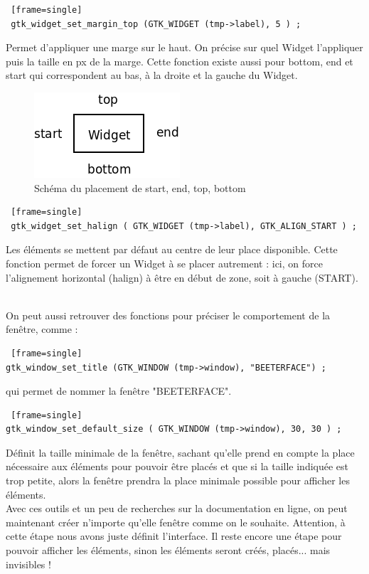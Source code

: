 \documentclass[11pt,french,a4paper]{report}
\begin{document}
\begin{lstlisting} [frame=single]
 gtk_widget_set_margin_top (GTK_WIDGET (tmp->label), 5 ) ; 
\end{lstlisting}
Permet d'appliquer une marge sur le haut. On précise sur quel Widget l'appliquer puis la taille en px de la marge.
Cette fonction existe aussi pour bottom, end et start qui correspondent au bas, à la droite et la gauche du Widget.\\
\begin{figure} [!h]
    \centering
        \includegraphics[scale=0.5]{../images/dia/top_bottom_etc.png}
        \caption{Schéma du placement de start, end, top, bottom}
        \label{sch_pla_top}
\end{figure}


\begin{lstlisting} [frame=single]
 gtk_widget_set_halign ( GTK_WIDGET (tmp->label), GTK_ALIGN_START ) ;
\end{lstlisting}
Les éléments se mettent par défaut au centre de leur place disponible. Cette fonction permet 
de forcer un Widget à se placer autrement : ici, on force l'alignement horizontal (halign) à être en début de zone, 
soit à gauche (START). \

On peut aussi retrouver des fonctions pour préciser le comportement de la fenêtre, comme :
\begin{lstlisting} [frame=single]
gtk_window_set_title (GTK_WINDOW (tmp->window), "BEETERFACE") ; 
\end{lstlisting}
qui permet de nommer la fenêtre "BEETERFACE". \\

\begin{lstlisting} [frame=single]
gtk_window_set_default_size ( GTK_WINDOW (tmp->window), 30, 30 ) ; 
\end{lstlisting}
Définit la taille minimale de la fenêtre, sachant qu'elle prend en compte la place nécessaire aux éléments pour pouvoir 
être placés et que si la taille indiquée est trop petite, alors la fenêtre prendra la place minimale possible 
pour afficher les éléments. \\

Avec ces outils et un peu de recherches sur la documentation en ligne, on peut maintenant créer n'importe qu'elle fenêtre 
comme on le souhaite. 
Attention, à cette étape nous avons juste définit l'interface. Il reste encore une étape pour pouvoir afficher les éléments, sinon
les éléments seront créés, placés... mais invisibles ! 
\end{document}
